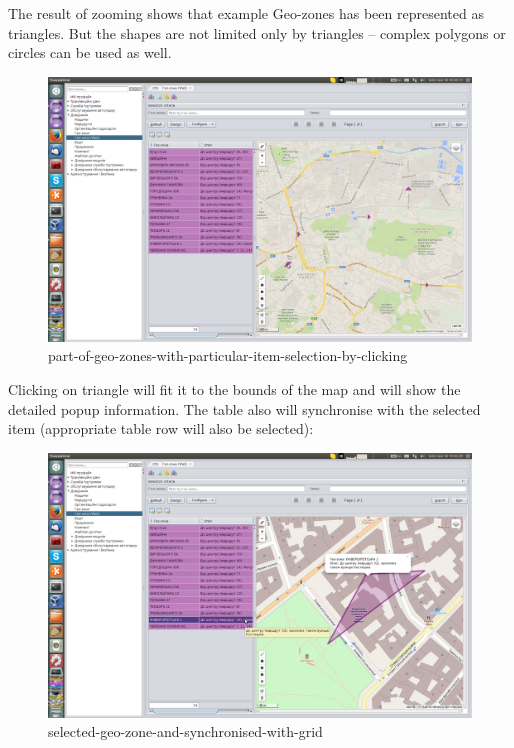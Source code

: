 The result of zooming shows that example Geo-zones has been represented as triangles. But the shapes are not 
limited only by triangles -- complex polygons or circles can be used as well.
\begin{figure}[!htp]
\centering
\includegraphics[width=16cm]{chapters/01-geozones/images/03-part-of-geo-zones-with-particular-item-selection-by-clicking.png}
\caption{part-of-geo-zones-with-particular-item-selection-by-clicking}\label{fig:03}
\end{figure}
Clicking on triangle will fit it to the bounds of the map and will show the detailed popup information. The table 
also will synchronise with the selected item (appropriate table row will also be selected):
\begin{figure}[!htp]
\centering
\includegraphics[width=16cm]{chapters/01-geozones/images/04-selected-geo-zone-and-synchronised-with-grid.png}
\caption{selected-geo-zone-and-synchronised-with-grid}\label{fig:04}
\end{figure}
